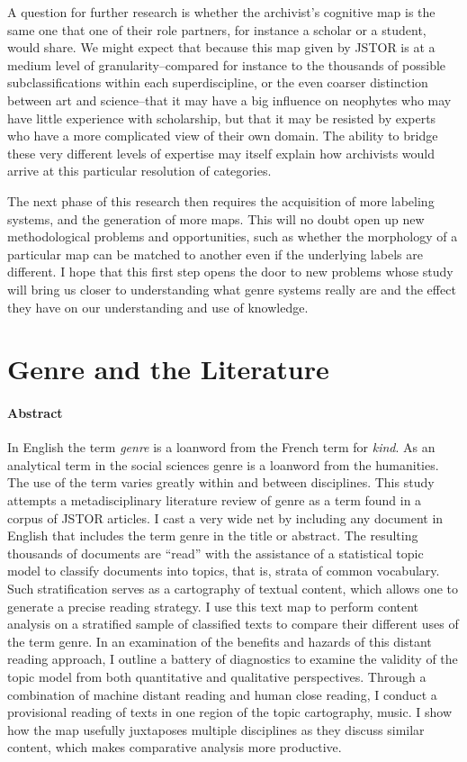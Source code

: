\documentclass[]{book}
\theoremstyle{definition}
\theoremstyle{definition}
\theoremstyle{definition}
\theoremstyle{remark}
\begin{document}
A question for further research is whether the archivist's cognitive map
is the same one that one of their role partners, for instance a scholar
or a student, would share. We might expect that because this map given
by JSTOR is at a medium level of granularity--compared for instance to
the thousands of possible subclassifications within each
superdiscipline, or the even coarser distinction between art and
science--that it may have a big influence on neophytes who may have
little experience with scholarship, but that it may be resisted by
experts who have a more complicated view of their own domain. The
ability to bridge these very different levels of expertise may itself
explain how archivists would arrive at this particular resolution of
categories.

The next phase of this research then requires the acquisition of more
labeling systems, and the generation of more maps. This will no doubt
open up new methodological problems and opportunities, such as whether
the morphology of a particular map can be matched to another even if the
underlying labels are different. I hope that this first step opens the
door to new problems whose study will bring us closer to understanding
what genre systems really are and the effect they have on our
understanding and use of knowledge.

\hypertarget{gen}{%
\chapter{Genre and the Literature}\label{gen}}

\hypertarget{abstract-2}{%
\subsubsection*{Abstract}\label{abstract-2}}


In English the term \emph{genre} is a loanword from the
French term for \emph{kind}. As an analytical term in the social
sciences genre is a loanword from the humanities. The use of the term
varies greatly within and between disciplines. This study attempts a
metadisciplinary literature review of genre as a term found in a corpus
of JSTOR articles. I cast a very wide net by including any document in
English that includes the term genre in the title or abstract. The
resulting thousands of documents are ``read'' with the assistance of a
statistical topic model to classify documents into topics, that is,
strata of common vocabulary. Such stratification serves as a cartography
of textual content, which allows one to generate a precise reading
strategy. I use this text map to perform content analysis on a
stratified sample of classified texts to compare their different uses of
the term genre. In an examination of the benefits and hazards of this
distant reading approach, I outline a battery of diagnostics to examine
the validity of the topic model from both quantitative and qualitative
perspectives. Through a combination of machine distant reading and human
close reading, I conduct a provisional reading of texts in one region of
the topic cartography, music. I show how the map usefully juxtaposes
multiple disciplines as they discuss similar content, which makes
comparative analysis more productive.
\end{document}
